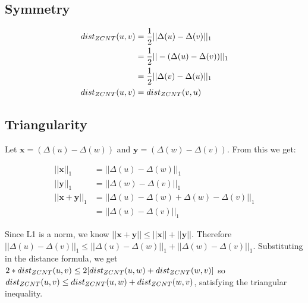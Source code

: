 \vspace{10pt}

\subsection{Symmetry}

\begin{align*}
    dist_{ZCNT} (u, v) &= \frac{1}{2} || \Delta(u) - \Delta(v) ||_1 \\ 
    &= \frac{1}{2} || -(\Delta(u) - \Delta(v)) ||_1 \\
    &= \frac{1}{2} ||  \Delta(v) - \Delta(u) ||_1 \\ 
    dist_{ZCNT} (u, v) &= dist_{ZCNT}(v, u)
\end{align*}

\subsection{Triangularity} 

Let $\mathbf x = (\Delta(u) - \Delta(w))$ and $\mathbf y = (\Delta(w) - \Delta(v))$. From this we get: 

\begin{align*}
    ||\mathbf x||_1 &= ||\Delta(u) - \Delta(w)||_1 \\ 
    ||\mathbf y||_1 &= ||\Delta(w) - \Delta(v)||_1 \\ 
    ||\mathbf x + \mathbf y||_1 &= ||\Delta(u) - \Delta(w) + \Delta(w) - \Delta(v)||_1 \\ 
    &= ||\Delta(u) - \Delta(v)||_1
\end{align*} 

Since L1 is a norm, we know $||\mathbf x + \mathbf y|| \leq ||\mathbf x|| + ||\mathbf y||$. Therefore $||\Delta(u) - \Delta(v)||_1 \leq ||\Delta(u) - \Delta(w)||_1 + ||\Delta(w) - \Delta(v)||_1$. Substituting in the distance formula, we get $2*dist_{ZCNT}(u, v) \leq 2 [dist_{ZCNT}(u, w) + dist_{ZCNT}(w, v)]$ so $dist_{ZCNT}(u, v) \leq dist_{ZCNT}(u, w) + dist_{ZCNT}(w, v)$, satisfying the triangular inequality. 

